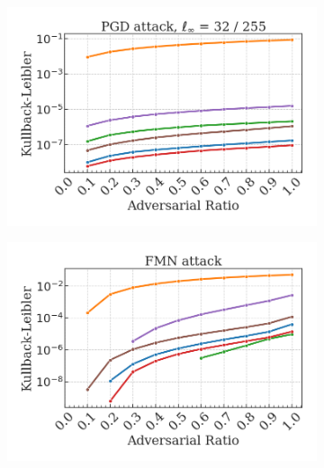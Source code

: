 \begin{figure}[H]
    \centering
    \begin{subfigure}[b]{0.45\textwidth}
        \centering
        \includegraphics[width=\textwidth]{img/results_discussion/adversarial/PGD_KL.png}
    \end{subfigure}
    \hfill
    \begin{subfigure}[b]{0.45\textwidth}
        \centering
        \includegraphics[width=\textwidth]{img/results_discussion/adversarial/FMN_KL.png}
    \end{subfigure}

    \vspace{1em}


\end{figure}
